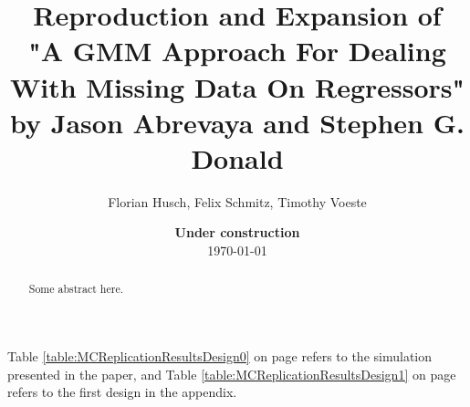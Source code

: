 \documentclass[11pt, a4paper, leqno]{article}
\begin{document}
\title{Reproduction and Expansion of \\"A GMM Approach For Dealing With Missing Data On Regressors" by Jason Abrevaya and Stephen G. Donald}

\author{Florian Husch, Felix Schmitz, Timothy Voeste}

\date{
    {\bf Under construction}
    \\[1ex]
    \today
}

\maketitle
{}

\begin{abstract}
    Some abstract here.
\end{abstract}

\clearpage



Table \ref{table:MCReplicationResultsDesign0} on page \pageref{table:MCReplicationResultsDesign0} refers
to the simulation presented in the paper, and Table \ref{table:MCReplicationResultsDesign1} on page \pageref{table:MCReplicationResultsDesign1}
refers to the first design in the appendix.


\end{document}
